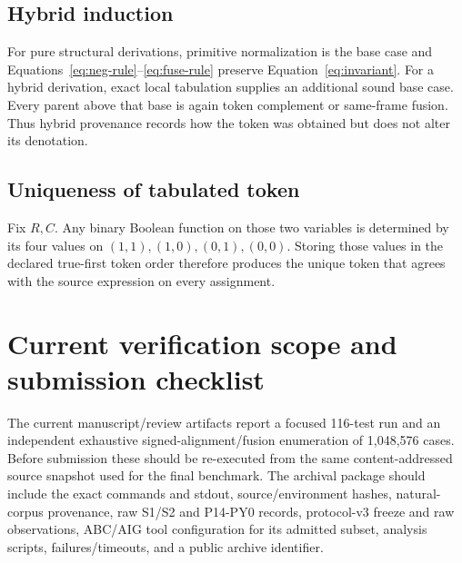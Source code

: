 \documentclass[10pt]{article}
\theoremstyle{plain}
\theoremstyle{definition}
\theoremstyle{remark}
\begin{document}
\subsection{Hybrid induction}

For pure structural derivations, primitive normalization is the base case and Equations~\eqref{eq:neg-rule}--\eqref{eq:fuse-rule} preserve Equation~\eqref{eq:invariant}. For a hybrid derivation, exact local tabulation supplies an additional sound base case. Every parent above that base is again token complement or same-frame fusion. Thus hybrid provenance records how the token was obtained but does not alter its denotation.

\subsection{Uniqueness of tabulated token}

Fix $R,C$. Any binary Boolean function on those two variables is determined by its four values on $(1,1),(1,0),(0,1),(0,0)$. Storing those values in the declared true-first token order therefore produces the unique token that agrees with the source expression on every assignment.

\section{Current verification scope and submission checklist}

The current manuscript/review artifacts report a focused 116-test run and an independent exhaustive signed-alignment/fusion enumeration of 1,048,576 cases. Before submission these should be re-executed from the same content-addressed source snapshot used for the final benchmark. The archival package should include the exact commands and stdout, source/environment hashes, natural-corpus provenance, raw S1/S2 and P14-PY0 records, protocol-v3 freeze and raw observations, ABC/AIG tool configuration for its admitted subset, analysis scripts, failures/timeouts, and a public archive identifier.
\end{document}

